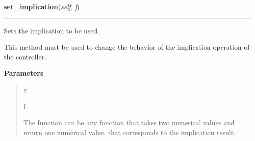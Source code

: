     \begin{boxedminipage}{\textwidth}

    \raggedright \textbf{set\_implication}(\textit{self}, \textit{f})

    \vspace{-1.5ex}

    \rule{\textwidth}{0.5\fboxrule}

Sets the implication to be used.

This method must be used to change the behavior of the implication
operation of the controller.
    \vspace{1ex}

      \textbf{Parameters}
      \begin{quote}
        \begin{Ventry}{x}

          \item[f]


The function can be any function that takes two numerical values and
return one numerical value, that corresponds to the implication
result.
        \end{Ventry}

      \end{quote}

    \vspace{1ex}

    \end{boxedminipage}

    \label{peach:fuzzy:control:Controller:set_negation}

    \vspace{0.5ex}

